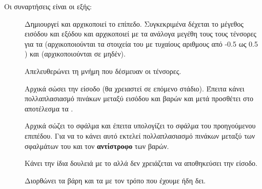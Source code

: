 Οι συναρτήσεις είναι οι εξής:
\begin{description}
    \item[] Δημιουργεί και αρχικοποιεί το επίπεδο. Συγκεκριμένα δέχεται το μέγεθος εισόδου και εξόδου και αρχικοποιεί με τα ανάλογα μεγέθη τους τους τένσορες για τα  (αρχικοποιούνται τα στοιχεία του με
    τυχαίους αριθμους από -0.5 ως 0.5 )  και  (αρχικοποιούνται σε μηδέν).
    \item[] Απελευθερώνει τη μνήμη που δέσμευαν οι τένσορες.
    \item[] Αρχικά σώσει την είσοδο (θα χρειαστεί σε επόμενο στάδιο). Έπειτα κάνει πολλαπλασιασμό πινάκων μεταξύ εισόδου και βαρών και μετά προσθέτει στο αποτέλεσμα τα .
    \item[] Αρχικά σώζει το σφάλμα και έπειτα υπολογίζει το σφάλμα του προηγούμενου επιπέδου. Για να το κάνει αυτό εκτελεί πολλαπλασιασμό πινάκων μεταξύ των σφαλμάτων του και τον \textbf{αντίστροφο} των βαρών.
    \item[] Κάνει την ίδια δουλειά με το  αλλά δεν χρειάζεται να αποθηκεύσει την είσοδο.
    \item[] Διορθώνει τα βάρη και τα  με τον τρόπο που έχουμε ήδη δει.
\end{description}